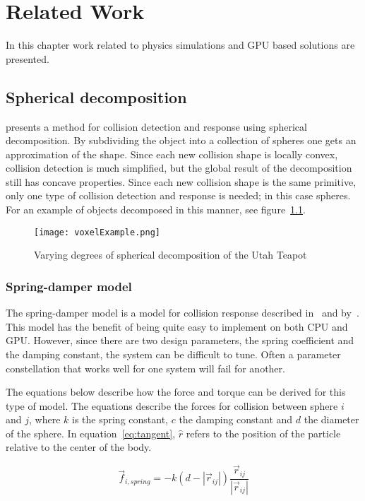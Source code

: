 \chapter{Related Work}\label{cha:related}
In this chapter work related to physics simulations and GPU based solutions are
presented.
\section{Spherical decomposition}\label{sec:decomp}
\cite{gpugems} presents a method for collision detection and response using spherical
decomposition. By subdividing the object into a collection of spheres one gets an
approximation of the shape. Since each new collision shape is locally convex, collision
detection is much simplified, but the global result of the decomposition still has
concave properties. Since each new collision shape is the same primitive, only
one type of collision detection and response is needed; in this case spheres.
For an example of objects
decomposed in this manner, see figure~\ref{fig:bunnies}.

\begin{figure}[H]
  \centering
  \texttt{[image: voxelExample.png]}
  \caption{Varying degrees of spherical decomposition of the Utah Teapot}
  \label{fig:bunnies}
\end{figure}

\subsection{Spring-damper model}
The spring-damper model is a model for collision response described in~\cite{gpugems} and by~\cite{fossum}.
This model has the benefit of being quite easy to implement on both CPU and GPU.
However, since there are two design parameters, the spring coefficient and the damping
constant, the system can be difficult to tune. Often a parameter constellation that works
well for one system will fail for another.

The equations below describe how the force and torque can be derived for this type
of model. The equations describe the forces for collision between sphere $i$ and $j$,
where $k$ is the spring constant, $c$ the damping constant and $d$ the
diameter of the sphere. In equation~\ref{eq:tangent}, $\hat{r}$ refers to the
position of the particle relative to the center of the body.

\begin{equation}
  \vec{f}_{i,spring} = -k(d-|\vec{r}_{ij}|)\frac{\vec{r}_{ij}}{|\vec{r}_{ij}|}
\end{equation}

